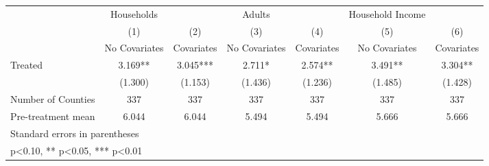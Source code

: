 {
\def\sym#1{\ifmmode^{#1}\else\(^{#1}\)\fi}
\begin{tabular}{l*{6}{c}}
\hline\hline
            &  Households   &               &      Adults   &               &Household Income   &               \\
            &\multicolumn{1}{c}{(1)}&\multicolumn{1}{c}{(2)}&\multicolumn{1}{c}{(3)}&\multicolumn{1}{c}{(4)}&\multicolumn{1}{c}{(5)}&\multicolumn{1}{c}{(6)}\\
            &\multicolumn{1}{c}{No Covariates}&\multicolumn{1}{c}{Covariates}&\multicolumn{1}{c}{No Covariates}&\multicolumn{1}{c}{Covariates}&\multicolumn{1}{c}{No Covariates}&\multicolumn{1}{c}{Covariates}\\
\hline
Treated     &       3.169** &       3.045***&       2.711*  &       2.574** &       3.491** &       3.304** \\
            &     (1.300)   &     (1.153)   &     (1.436)   &     (1.236)   &     (1.485)   &     (1.428)   \\
\hline
Number of Counties&         337   &         337   &         337   &         337   &         337   &         337   \\
Pre-treatment mean&       6.044   &       6.044   &       5.494   &       5.494   &       5.666   &       5.666   \\
\hline\hline
\multicolumn{7}{l}{\footnotesize Standard errors in parentheses}\\
\multicolumn{7}{l}{\footnotesize * p<0.10, ** p<0.05, *** p<0.01}\\
\end{tabular}
}
